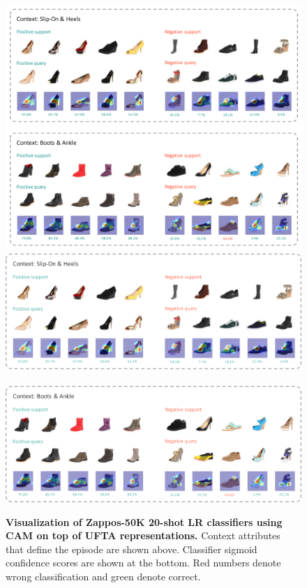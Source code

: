 \begin{figure}[t]
\centering
\iflatexml
\includegraphics[width=6\linewidth]{figures/additional_viz_zappos.png}
\else
\includegraphics[width=0.9\linewidth]{figures/additional_viz_zappos_1.pdf}\\
\quad \\
\includegraphics[width=0.9\linewidth]{figures/additional_viz_zappos_2.pdf}
\fi
\caption{\textbf{Visualization of Zappos-50K 20-shot LR classifiers using CAM
on top of UFTA representations.} Context attributes that define the episode are
shown above. Classifier sigmoid confidence scores are shown at the bottom. Red
numbers denote wrong classification and green denote correct. }
\label{fig:zappos-additional}
\end{figure}





